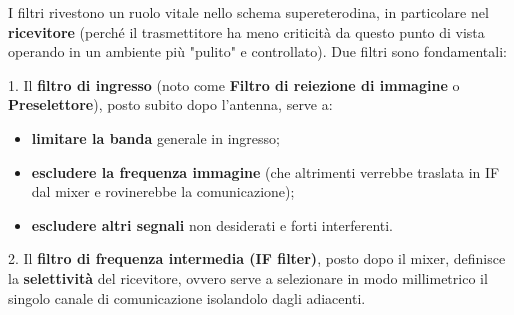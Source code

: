 \documentclass[openany,a4paper,12pt]{book}
\begin{document}
I filtri rivestono un ruolo vitale nello schema supereterodina, in particolare nel \textbf{ricevitore} (perché il trasmettitore ha meno criticità da questo punto di vista operando in un ambiente più "pulito" e controllato). Due filtri sono fondamentali:

1. Il \textbf{filtro di ingresso} (noto come \textbf{Filtro di reiezione di immagine} o \textbf{Preselettore}), posto subito dopo l'antenna, serve a:
\begin{itemize}[label=\textcolor{OpticRed}{\textbullet}]
    \item \textbf{limitare la banda} generale in ingresso;
    \item \textbf{escludere la frequenza immagine} (che altrimenti verrebbe traslata in IF dal mixer e rovinerebbe la comunicazione);
    \item \textbf{escludere altri segnali} non desiderati e forti interferenti.
\end{itemize}

2. Il \textbf{filtro di frequenza intermedia (IF filter)}, posto dopo il mixer, definisce la \textbf{selettività} del ricevitore, ovvero serve a selezionare in modo millimetrico il singolo canale di comunicazione isolandolo dagli adiacenti.


\end{document}
